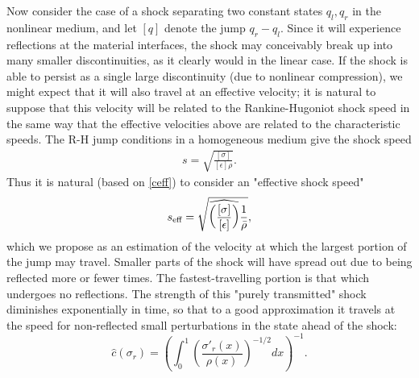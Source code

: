 
Now consider the case of a shock separating two constant states $q_l,q_r$
in the nonlinear medium, and let $[q]$ denote the jump $q_r-q_l$.  Since it will experience reflections at the 
material interfaces, the shock may conceivably break up into many smaller
discontinuities, as it clearly would in the linear case.  If the shock
is able to persist as a single large discontinuity (due to nonlinear
compression), we might expect that it will also travel at an effective 
velocity; it is natural
to suppose that this velocity will be related to the Rankine-Hugoniot shock
speed in the same way that the effective velocities above are related to
the characteristic speeds.  The R-H jump conditions in a homogeneous medium
give the shock speed
\begin{align} \label{shockspeed}
s = \sqrt{\frac{[\sigma]}{[\epsilon]\rho}}.
\end{align}
Thus it is natural (based on \eqref{ceff}) to consider an "effective shock speed"
\begin{align} \label{effshockspeed}
s_\textup{eff} = \sqrt{\widehat{\left(\frac{[\sigma]}{[\epsilon]}\right)}\frac{1}{\bar{\rho}}},
\end{align}
which we propose as an estimation of the velocity at which the 
largest portion of the jump may travel.  Smaller parts of the shock will 
have spread out due to being reflected more or fewer times.  The fastest-travelling
portion is that which undergoes no reflections.
The strength of this "purely transmitted" 
shock diminishes exponentially in time, so that to a good approximation it travels
at the speed for non-reflected small perturbations in the state ahead of the shock:
$$\hat{c}(\sigma_r) = \left(\int_0^1 \left(\frac{\sigma'_r(x)}{\rho(x)}\right)^{-1/2}dx\right)^{-1}.$$

